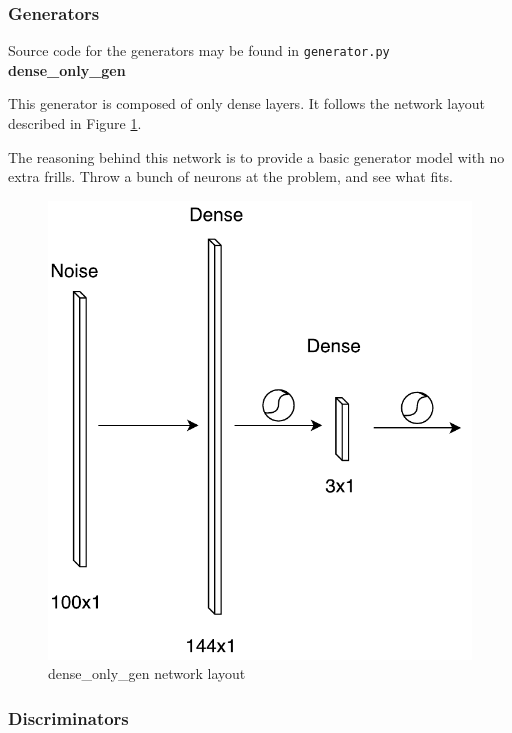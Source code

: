 \documentclass[12pt]{article}
\begin{document}
\subsubsection{Generators}

Source code for the generators may be found in \texttt{generator.py} \\

\noindent \textbf{dense\_only\_gen}

This generator is composed of only dense layers. It follows the network layout described in Figure \ref{fig:dense_only_gen}.

The reasoning behind this network is to provide a basic generator model with no extra frills. Throw a bunch of neurons at the problem, and see what fits.

\begin{figure}[ht]
    \centering
    \includegraphics[scale=0.65]{img/dense_only_gen}
    \caption{dense\_only\_gen network layout}
    \label{fig:dense_only_gen}
\end{figure}

\subsubsection{Discriminators}
\end{document}
